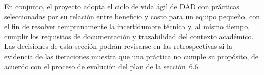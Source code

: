En conjunto, el proyecto adopta el ciclo de vida ágil de DAD con prácticas seleccionadas por su relación entre beneficio y costo para un equipo pequeño, con el fin de resolver tempranamente la incertidumbre técnica y, al mismo tiempo, cumplir los requisitos de documentación y trazabilidad del contexto académico. Las decisiones de esta sección podrán revisarse en las retrospectivas si la evidencia de las iteraciones muestra que una práctica no cumple su propósito, de acuerdo con el proceso de evolución del plan de la sección~6.6.
